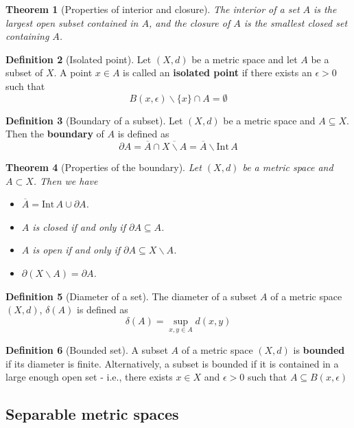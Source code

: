 \documentclass[10pt, oneside, reqno]{amsart}
\theoremstyle{plain}%
\newtheorem{thm}{Theorem}[section]
\theoremstyle{definition}
\newtheorem{defn}[thm]{Definition}
\theoremstyle{remark}
\newcommand{\met}{(X,d)}
\newcommand{\intr}{\text{Int}\,}
\newcommand{\ol}[1]{\overline{#1}}
\begin{document}
\begin{thm}[Properties of interior and closure]
	The interior of a set $A$ is the largest open subset contained in $A$, and the closure of $A$ is the smallest closed set containing $A$.
\end{thm}


\begin{defn}[Isolated point]
	Let $\met$ be a metric space and let $A$ be a subset of $X$.  A point $x \in A$ is called an \textbf{isolated point} if there exists an $\epsilon > 0$ such that \[
		B(x, \epsilon) \backslash \{ x \} \cap A = \emptyset
	\]
\end{defn}

\begin{defn}[Boundary of a subset]
Let $\met$ be a metric space and $A \subseteq X$.  Then the \textbf{boundary} of $A$ is defined as \[
	\partial A = \ol{A} \cap \ol{X \backslash A} = \ol{A} \backslash \intr A
\]
\end{defn}
\begin{thm}[Properties of the boundary]
	Let $\met$ be a metric space and $A \subset X$. Then we have \begin{itemize}
		\item $\ol A = \intr A \cup \partial A$.
		\item $A$ is closed if and only if $\partial A \subseteq A$.
		\item $A$ is open if and only if $\partial A \subseteq X \backslash A$.
		\item $\partial (X \backslash A) = \partial A$.
	\end{itemize}
\end{thm}


\begin{defn}[Diameter of a set]
	The diameter of a subset $A$ of a metric space $\met$, $\delta(A)$ is defined as \[
		\delta(A) = \sup_{x,y \in A} d(x,y)
	\]
\end{defn}

\begin{defn}[Bounded set]
	A subset $A$ of a metric space $\met$ is \textbf{bounded} if its diameter is finite.  Alternatively, a subset is bounded if it is contained in a large enough open set - i.e., there exists $x \in X$ and $\epsilon > 0$ such that $ A \subseteq B(x, \epsilon)$ 
\end{defn}

\subsection{Separable metric spaces} %
\label{sub:separable_metric_spaces}
\end{document}
